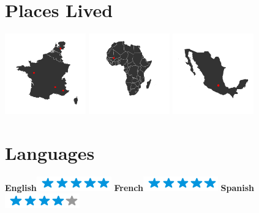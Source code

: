 \documentclass[]{friggeri-cv}
\begin{document}
\begin{aside}
~
~
~
  \section{Places Lived}
    \includegraphics[width=3.5cm]{img/map.png}
    \includegraphics[width=3.5cm]{img/mapAfrica.png}
    \includegraphics[width=3.5cm]{img/mapMex.png}
    ~
  \section{Languages}
    \textbf{English}\includegraphics[scale=0.40]{img/5stars.png}
    \textbf{French}\includegraphics[scale=0.40]{img/5stars.png}
    \textbf{Spanish}\includegraphics[scale=0.40]{img/4stars.png}
\end{aside}

\end{document}
